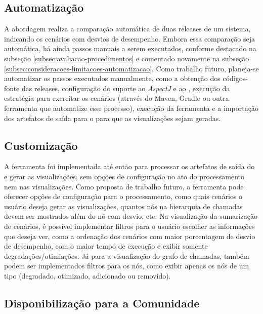 \subsection{Automatização} \label{subsec:consideracoes-automatizacao}

A abordagem realiza a comparação automática de duas releases de um sistema, indicando os cenários com desvios de desempenho. Embora essa comparação seja automática, há ainda passos manuais a serem executados, conforme destacado na subseção \ref{subsec:avaliacao-procedimentos} e comentado novamente na subseção \ref{subsec:consideracoes-limitacoes-automatizacao}. Como trabalho futuro, planeja-se automatizar os passos executados manualmente, como a obtenção dos códigos-fonte das releases, configuração do suporte ao \textit{AspectJ} e ao \textit{\perfMinerName}, execução da estratégia para exercitar os cenários (através do Maven, Gradle ou outra ferramenta que automatize esse processo), execução da ferramenta e a importação dos artefatos de saída para o \textit{\toolName} para que as visualizações sejam geradas.

\subsection{Customização} \label{subsec:consideracoes-customizacao}

A ferramenta foi implementada até então para processar os artefatos de saída do \textit{\perfMinerName} e gerar as visualizações, sem opções de configuração no ato do processamento nem nas visualizações. Como proposta de trabalho futuro, a ferramenta pode oferecer opções de configuração para o processamento, como quais cenários o usuário deseja gerar as visualizações, quantos nós na hierarquia de chamadas devem ser mostrados além do nó com desvio, etc. Na visualização da sumarização de cenários, é possível implementar filtros para o usuário escolher as informações que deseja ver, como a ordenação dos cenários com maior porcentagem de desvio de desempenho, com o maior tempo de execução e exibir somente degradações/otimiações. Já para a visualização do grafo de chamadas, também podem ser implementados filtros para os nós, como exibir apenas os nós de um tipo (degradado, otimizado, adicionado ou removido).

\subsection{Disponibilização para a Comunidade}

